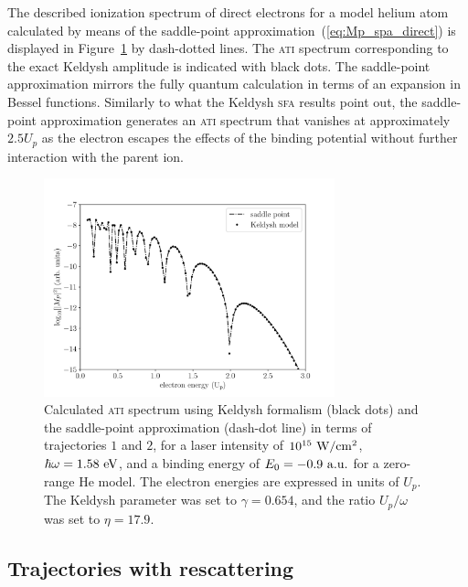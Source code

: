 The described ionization spectrum of direct electrons for a model
helium atom calculated by means of the saddle-point
approximation~(\ref{eq:Mp_spa_direct}) is displayed in
Figure~\ref{fig:ati_direct} by dash-dotted lines. The \textsc{ati}
spectrum corresponding to the exact Keldysh amplitude is indicated
with black dots. The saddle-point approximation mirrors the fully
quantum calculation in terms of an expansion in Bessel
functions. Similarly to what the Keldysh \textsc{sfa} results point
out, the saddle-point approximation generates an \textsc{ati} spectrum
that vanishes at approximately $2.5 U_{p}$ as the electron escapes the
effects of the binding potential without further interaction with the
parent ion.

\begin{figure}
  \centering
  \includegraphics[width = 0.75\textwidth]{figures/ch_ATI_SPA/direct/SPvsKeldysh_spa_discrete}
  \caption{Calculated \textsc{ati} spectrum using Keldysh formalism
    (black dots) and the saddle-point approximation (dash-dot line) in
    terms of trajectories $1$ and $2$, for a laser intensity of
    $10^{15}\ \rm{W/cm^{2}}$, $\hbar\omega = 1.58\ \rm{eV}$, and a
    binding energy of $E_{0} = -0.9\ \rm{a.u.}$ for a zero-range He
    model. The electron energies are expressed in units of
    $U_{p}$. The Keldysh parameter was set to $\gamma = 0.654$, and
    the ratio $U_{p}/\omega$ was set to $\eta = 17.9$.}
  \label{fig:ati_direct}
\end{figure}


\subsection{\label{sec:spa_resc} Trajectories with rescattering}

